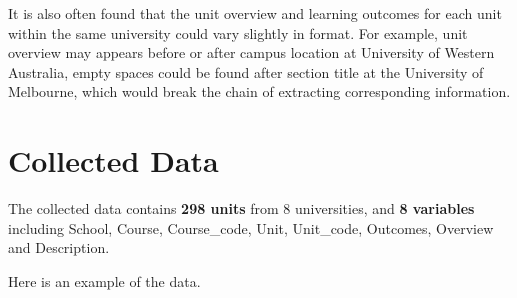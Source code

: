 \documentclass[
  letterpaper,
]{report}
\begin{document}
It is also often found that the unit overview and learning outcomes for
each unit within the same university could vary slightly in format. For
example, unit overview may appears before or after campus location at
University of Western Australia, empty spaces could be found after
section title at the University of Melbourne, which would break the
chain of extracting corresponding information.

\hypertarget{collected-data}{%
\section{Collected Data}\label{collected-data}}

The collected data contains \textbf{298 units} from 8 universities, and
\textbf{8 variables} including School, Course, Course\_code, Unit,
Unit\_code, Outcomes, Overview and Description.

Here is an example of the data.
\end{document}
